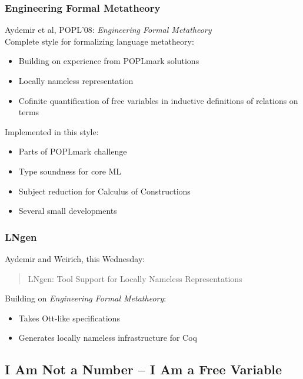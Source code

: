 \documentclass[notheorems]{beamer}
\begin{document}
\begin{frame}

  \frametitle{Engineering Formal Metatheory}

  Aydemir et al, POPL'08: {\em Engineering Formal Metatheory}\\[2em]

  Complete style for formalizing language metatheory:
  \begin{itemize}
    \item Building on experience from POPLmark solutions
    \item Locally nameless representation
    \item Cofinite quantification of free variables in inductive definitions of relations on terms\\[2em]
  \end{itemize}

  Implemented in this style:
  \begin{itemize}
    \item Parts of POPLmark challenge
    \item Type soundness for core ML
    \item Subject reduction for Calculus of Constructions
    \item Several small developments
  \end{itemize}

\end{frame}


\begin{frame}

  \frametitle{LNgen}

  Aydemir and Weirich, this Wednesday:
  \begin{quote}
    LNgen: Tool Support for Locally Nameless Representations\\[2em]
  \end{quote}

  Building on {\em Engineering Formal Metatheory}:
  \begin{itemize}
    \item Takes Ott-like specifications
    \item Generates locally nameless infrastructure for Coq
  \end{itemize}

\end{frame}


\subsection{I Am Not a Number -- I Am a Free Variable}
\end{document}
